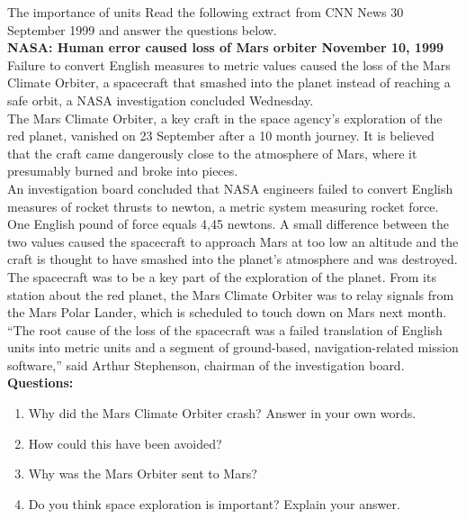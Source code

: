 \begin{casestudy}{The importance of units }
            \nopagebreak
Read the following extract from CNN News 30 September 1999 and answer the questions below.\\
\textbf{NASA: Human error caused loss of Mars orbiter November 10, 1999}\\
Failure to convert English measures to metric values caused the loss of the Mars Climate Orbiter, a spacecraft that smashed into the planet instead of reaching a safe orbit, a NASA investigation concluded Wednesday.\\
The Mars Climate Orbiter, a key craft in the space agency's exploration of the red planet, vanished on 23 September after a 10 month journey. It is believed that the craft came dangerously close to the atmosphere of Mars, where it presumably burned and broke into pieces.\\
An investigation board concluded that NASA engineers failed to convert English measures of rocket thrusts to newton, a metric system measuring rocket force. One English pound of force equals 4,45 newtons. A small difference between the two values caused the spacecraft to approach Mars at too low an altitude and the craft is thought to have smashed into the planet's atmosphere and was destroyed.\\
The spacecraft was to be a key part of the exploration of the planet. From its station about the red planet, the Mars Climate Orbiter was to relay signals from the Mars Polar Lander, which is scheduled to touch down on Mars next month.\\
``The root cause of the loss of the spacecraft was a failed translation of English units into metric units and a segment of ground-based, navigation-related mission software,'' said Arthur Stephenson, chairman of the investigation board.\\
\textbf{Questions:}\\
\begin{enumerate}[noitemsep, label=\textbf{\arabic*}. ] 
\item Why did the Mars Climate Orbiter crash? Answer in your own words.
\item How could this have been avoided?
\item Why was the Mars Orbiter sent to Mars?
\item Do you think space exploration is important? Explain your answer.
\end{enumerate}
\end{casestudy}
